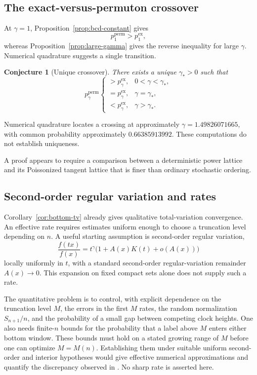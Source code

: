 \documentclass[11pt]{article}
\numberwithin{equation}{section}
\newtheorem{conjecture}[theorem]{Conjecture}
\theoremstyle{definition}
\theoremstyle{remark}
\begin{document}
\subsection{The exact-versus-permuton crossover}

At $\gamma=1$, Proposition~\ref{prop:bcd-constant} gives
\[
  p_1^{\mathrm{perm}}>p_1^{\mathrm{ex}},
\]
whereas Proposition~\ref{prop:large-gamma} gives the reverse inequality for large $\gamma$.  Numerical quadrature suggests a single transition.

\begin{conjecture}[Unique crossover]
\label{conj:crossover}
There exists a unique $\gamma_*>0$ such that
\[
  p_\gamma^{\mathrm{perm}}
  \begin{cases}
  >p_\gamma^{\mathrm{ex}},&0<\gamma<\gamma_*,\\
  =p_\gamma^{\mathrm{ex}},&\gamma=\gamma_*,\\
  <p_\gamma^{\mathrm{ex}},&\gamma>\gamma_*.
  \end{cases}
\]
\end{conjecture}

Numerical quadrature locates a crossing at approximately
$\gamma=1.49826071665$, with common probability approximately
$0.66385913992$.  These computations do not establish uniqueness.

A proof appears to require a comparison between a deterministic power lattice and its Poissonized tangent lattice that is finer than ordinary stochastic ordering.

\subsection{Second-order regular variation and rates}

Corollary~\ref{cor:bottom-tv} already gives qualitative total-variation
convergence.  An effective rate requires estimates uniform enough to
choose a truncation level depending on $n$.  A useful starting
assumption is second-order regular variation,
\[
  \frac{f(tx)}{f(x)}
  =t^\gamma\bigl(1+A(x)K(t)+o(A(x))\bigr)
\]
locally uniformly in $t$, with a standard second-order
regular-variation remainder $A(x)\to0$.  This expansion on fixed
compact sets alone does not supply such a rate.

The quantitative problem is to control, with explicit dependence on
the truncation level $M$, the errors in the first $M$ rates, the random
normalization $S_{n+1}/n$, and the probability of a small gap between
competing clock heights.  One also needs finite-$n$ bounds for the
probability that a label above $M$ enters either bottom window.
These bounds must hold on a stated growing range of $M$ before one
can optimize $M=M(n)$.  Establishing them under suitable uniform
second-order and interior hypotheses would give effective numerical
approximations and quantify the discrepancy observed in
\cite[Section~2.4]{BCD}.  No sharp rate is asserted here.
\end{document}
